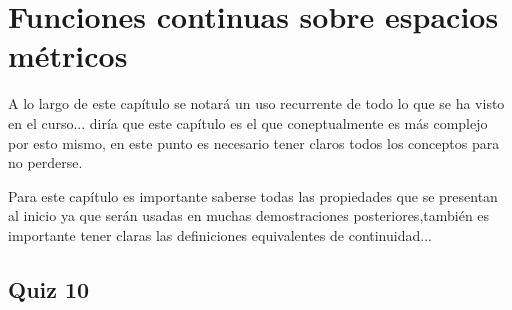 
\section{Funciones continuas sobre espacios métricos}

A lo largo de este capítulo se notará un uso recurrente de todo lo que se ha visto en el curso... diría que este capítulo es el que coneptualmente es más complejo por esto mismo, en este punto es necesario tener claros todos los conceptos para no perderse.

\begin{note}
Para este capítulo es importante saberse todas las propiedades que se presentan al inicio ya que serán usadas en muchas demostraciones posteriores,también es importante tener claras las definiciones equivalentes de continuidad...
\end{note}

\subsection{Quiz 10}



